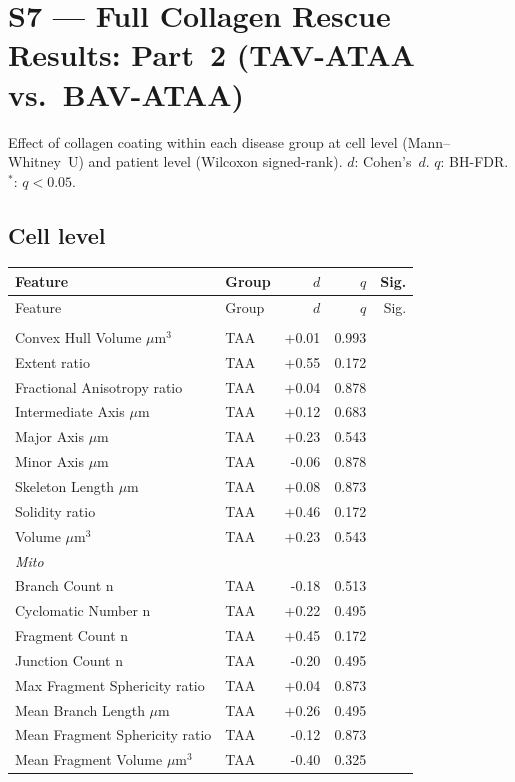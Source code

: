 \documentclass[11pt,a4paper]{article}
\begin{document}
\section*{S7 — Full Collagen Rescue Results: Part~2 (TAV-ATAA vs.\ BAV-ATAA)}
Effect of collagen coating within each disease group at cell level (Mann--Whitney~U)
and patient level (Wilcoxon signed-rank). $d$: Cohen's~$d$. $q$: BH-FDR. $^{*}$: $q<0.05$.
\vspace{1em}
\subsection*{Cell level}
\begin{longtable}{llrrr}
\toprule
Feature & Group & $d$ & $q$ & Sig. \\
\midrule\endfirsthead
\toprule Feature & Group & $d$ & $q$ & Sig. \\\midrule\endhead
\bottomrule\endfoot
\multicolumn{5}{l}{\textit{Actin}} \\
  Convex Hull Volume $\mu$m$^{3}$ & TAA & +0.01 & 0.993 &  \\
  Extent ratio & TAA & +0.55 & 0.172 &  \\
  Fractional Anisotropy ratio & TAA & +0.04 & 0.878 &  \\
  Intermediate Axis $\mu$m & TAA & +0.12 & 0.683 &  \\
  Major Axis $\mu$m & TAA & +0.23 & 0.543 &  \\
  Minor Axis $\mu$m & TAA & -0.06 & 0.878 &  \\
  Skeleton Length $\mu$m & TAA & +0.08 & 0.873 &  \\
  Solidity ratio & TAA & +0.46 & 0.172 &  \\
  Volume $\mu$m$^{3}$ & TAA & +0.23 & 0.543 &  \\
\midrule
\multicolumn{5}{l}{\textit{Mito}} \\
  Branch Count n & TAA & -0.18 & 0.513 &  \\
  Cyclomatic Number n & TAA & +0.22 & 0.495 &  \\
  Fragment Count n & TAA & +0.45 & 0.172 &  \\
  Junction Count n & TAA & -0.20 & 0.495 &  \\
  Max Fragment Sphericity ratio & TAA & +0.04 & 0.873 &  \\
  Mean Branch Length $\mu$m & TAA & +0.26 & 0.495 &  \\
  Mean Fragment Sphericity ratio & TAA & -0.12 & 0.873 &  \\
  Mean Fragment Volume $\mu$m$^{3}$ & TAA & -0.40 & 0.325 &  \\

\end{longtable}
\end{document}
